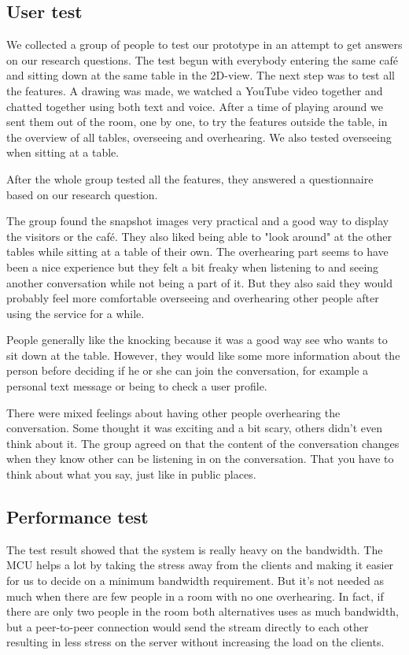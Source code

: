 \documentclass[12pt, titlepage]{article}
\begin{document}
\subsection{User test}
We collected a group of people to test our prototype in an attempt to get answers on our research questions. The test begun with everybody entering the same café and sitting down at the same table in the 2D-view. The next step was to test all the features. A drawing was made, we watched a YouTube video together and chatted together using both text and voice. After a time of playing around we sent them out of the room, one by one, to try the features outside the table, in the overview of all tables, overseeing and overhearing. We also tested overseeing when sitting at a table.

After the whole group tested all the features, they answered a questionnaire based on our research question.

The group found the snapshot images very practical and a good way to display the visitors or the café. They also liked being able to "look around" at the other tables while sitting at a table of their own. The overhearing part seems to have been a nice experience but they felt a bit freaky when listening to and seeing another conversation while not being a part of it. But they also said they would probably feel more comfortable overseeing and overhearing other people after using the service for a while.

People generally like the knocking because it was a good way see who wants to sit down at the table. However, they would like some more information about the person before deciding if he or she can join the conversation, for example a personal text message or being to check a user profile.

There were mixed feelings about having other people overhearing the conversation. Some thought it was exciting and a bit scary, others didn't even think about it. The group agreed on that the content of the conversation changes when they know other can be listening in on the conversation. That you have to think about what you say, just like in public places.

\subsection{Performance test}
The test result showed that the system is really heavy on the bandwidth. The MCU helps a lot by taking the stress away from the clients and making it easier for us to decide on a minimum bandwidth requirement. But it's not needed as much when there are few people in a room with no one overhearing. In fact, if there are only two people in the room both alternatives uses as much bandwidth, but a peer-to-peer connection would send the stream directly to each other resulting in less stress on the server without increasing the load on the clients.
\end{document}

